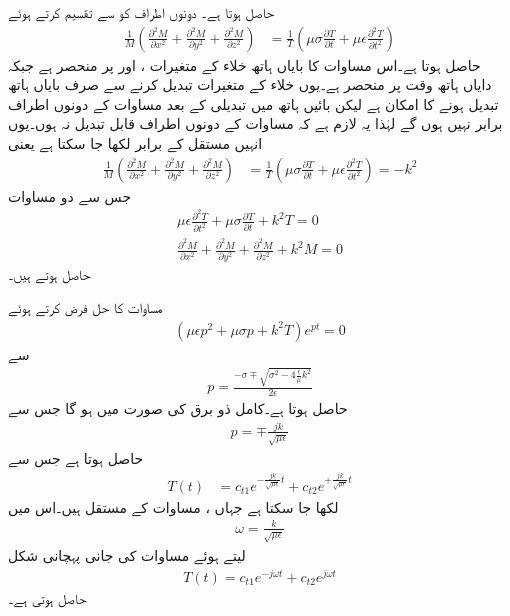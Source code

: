 حاصل ہوتا ہے۔ دونوں اطراف کو  سے تقسیم کرتے ہوئے
\begin{align*}
\frac{1}{M}\left(\frac{\partial^2 M}{\partial x^2}+\frac{\partial^2 M}{\partial y^2}+\frac{\partial^2 M}{\partial z^2}\right)&=\frac{1}{T}\left(\mu \sigma \frac{\partial T}{\partial t}+\mu\epsilon \frac{\partial^2 T}{\partial t^2}\right)
\end{align*}
حاصل ہوتا ہے۔اس مساوات کا بایاں ہاتھ خلاء کے متغیرات ،  اور  پر منحصر ہے جبکہ دایاں ہاتھ وقت  پر منحصر ہے۔یوں خلاء کے متغیرات تبدیل کرنے سے صرف بایاں ہاتھ تبدیل ہونے کا امکان ہے لیکن بائیں ہاتھ میں تبدیلی کے بعد مساوات کے دونوں اطراف برابر نہیں ہوں گے لہٰذا یہ لازم ہے کہ مساوات کے دونوں اطراف قابل تبدیل نہ ہوں۔یوں انہیں مستقل  کے برابر لکھا جا سکتا ہے یعنی
\begin{align*}
\frac{1}{M}\left(\frac{\partial^2 M}{\partial x^2}+\frac{\partial^2 M}{\partial y^2}+\frac{\partial^2 M}{\partial z^2}\right)&=\frac{1}{T}\left(\mu \sigma \frac{\partial T}{\partial t}+\mu\epsilon \frac{\partial^2 T}{\partial t^2}\right)=-k^2
\end{align*}
جس سے دو مساوات 
\begin{align}
\mu\epsilon \frac{\partial^2 T}{\partial t^2}+\mu \sigma \frac{\partial T}{\partial t}+k^2 T=0\label{مساوات_مویج_مستطیلی_گمکیا_ج}\\
\frac{\partial^2 M}{\partial x^2}+\frac{\partial^2 M}{\partial y^2}+\frac{\partial^2 M}{\partial z^2}+k^2 M=0\label{مساوات_مویج_مستطیلی_گمکیا_چ}
\end{align}
حاصل ہوتے ہیں۔

مساوات  کا حل  فرض کرتے ہوئے
\begin{align*}
\left(\mu\epsilon p^2+\mu \sigma p+k^2 T\right)e^{pt}=0
\end{align*}
سے
\begin{align*}
p=\frac{-\sigma\mp \sqrt{\sigma^2-4\frac{\epsilon}{\mu}k^2}}{2\epsilon}
\end{align*}
حاصل ہوتا ہے۔کامل ذو برق کی صورت میں  ہو گا جس سے
\begin{align}
p=\mp \frac{j k}{\sqrt{\mu \epsilon}} 
\end{align}
حاصل ہوتا ہے جس سے
\begin{align*}
T(t)&=c_{t1} e^{-\frac{j k}{\sqrt{\mu \epsilon}} t}+c_{t2} e^{+\frac{j k}{\sqrt{\mu \epsilon}} t}
\end{align*}
لکھا جا سکتا ہے  جہاں ،  مساوات کے مستقل ہیں۔اس میں
\begin{align}\label{مساوات_مویج_میکس_ویل_عمومی_تعدد}
\omega=\frac{ k}{\sqrt{\mu \epsilon}}
\end{align}
لیتے ہوئے مساوات کی جانی پہچانی شکل
\begin{align}
T(t)=c_{t1} e^{- j\omega t}+c_{t2} e^{ j\omega t}
\end{align}
حاصل ہوتی ہے۔

